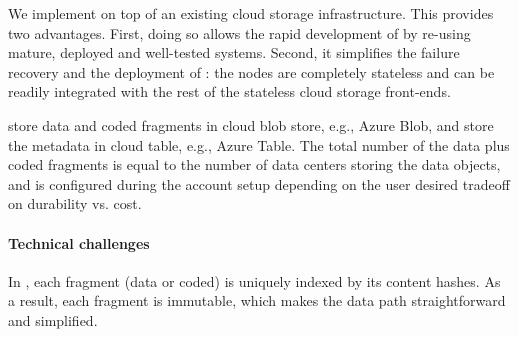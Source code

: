 We implement \name on top of an existing cloud storage infrastructure. This 
provides two advantages.  First, doing so allows the rapid development of \name by re-using 
mature, deployed and well-tested systems.  Second, it simplifies the failure recovery and 
the deployment of \name: the \name nodes are completely stateless and can be
readily integrated with the rest of the stateless cloud storage front-ends.

\name store data and coded fragments in cloud blob store, e.g., Azure Blob, and store the metadata in cloud table, 
e.g., Azure Table. 
The total number of the data plus coded fragments is equal to the number of data centers
storing the data objects, and is configured during the account setup depending on the user desired tradeoff on
durability vs. cost.

%


\paragraph{Technical challenges}
In \name, each fragment (data or coded) is uniquely indexed by its content hashes.
As a result, each fragment is immutable, which makes the data path straightforward and simplified. 

